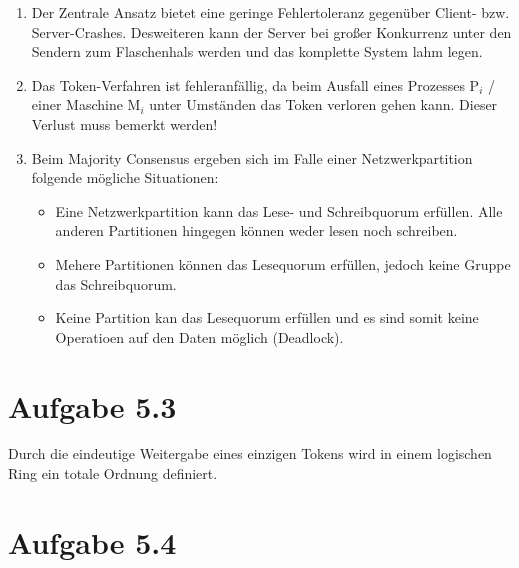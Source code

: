 \documentclass[german,12pt,a4paper]{article}
\begin{document}
\begin{enumerate}

	\item Der Zentrale Ansatz bietet eine geringe Fehlertoleranz gegenüber 
	Client- bzw. Server-Crashes. Desweiteren kann der Server bei großer 
	Konkurrenz unter den Sendern zum Flaschenhals werden und das komplette 
	System lahm legen.
	
	\item Das Token-Verfahren ist fehleranfällig, da beim Ausfall eines 
	Prozesses P$_{i}$ / einer Maschine M$_{i}$ unter Umständen das Token 
	verloren gehen kann. Dieser Verlust muss bemerkt werden!
	
	\item Beim Majority Consensus ergeben sich im Falle einer Netzwerkpartition 
	folgende mögliche Situationen:
	\begin{itemize}
		\item Eine Netzwerkpartition kann das Lese- und Schreibquorum erfüllen. 
		Alle anderen Partitionen hingegen können weder lesen noch schreiben.
		
		\item Mehere Partitionen können das Lesequorum erfüllen, jedoch keine 
		Gruppe das Schreibquorum.
		
		\item Keine Partition kan das Lesequorum erfüllen und es sind somit 
		keine Operatioen auf den Daten möglich (Deadlock).
		
	\end{itemize}

\end{enumerate}

\section*{Aufgabe 5.3}

Durch die eindeutige Weitergabe eines einzigen Tokens wird in einem \glqq{}logischen Ring\grqq{} ein
totale Ordnung definiert.

\section*{Aufgabe 5.4}
\end{document}
